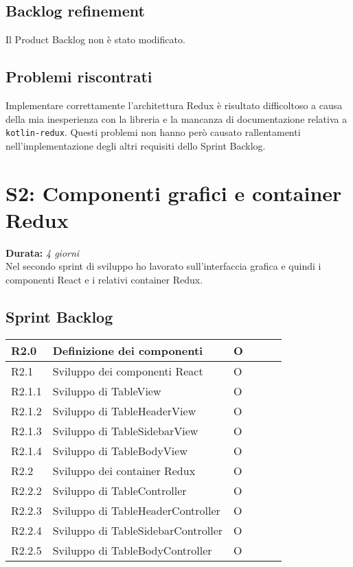 \subsection{Backlog refinement}
Il Product Backlog non è stato modificato.

\subsection{Problemi riscontrati}
Implementare correttamente l'architettura Redux è risultato difficoltoso a causa della mia inesperienza con la libreria e la mancanza di documentazione relativa a \verb|kotlin-redux|. Questi problemi non hanno però causato rallentamenti nell'implementazione degli altri requisiti dello Sprint Backlog.

\newpage

\section{S2: Componenti grafici e container Redux}
\textbf{Durata:} \textit{4 giorni} \\
Nel secondo sprint di sviluppo ho lavorato sull'interfaccia grafica e quindi i componenti React e i relativi container Redux.

\subsection{Sprint Backlog}
\begin{longtable} {
		|>{}p{10mm}| 
		|>{}p{90mm}|
		|>{}p{15mm}|
		|>{}p{15mm}|
		|>{}p{15mm}|
		>{}p{0mm}}
	\hline
R2.0   & \textbf{Definizione dei componenti} & O\\ \hline
R2.1   & Sviluppo dei componenti React 		  & O\\ \hline
R2.1.1 & Sviluppo di TableView                & O\\ \hline
R2.1.2 & Sviluppo di TableHeaderView          & O\\ \hline
R2.1.3 & Sviluppo di TableSidebarView         & O \\ \hline
R2.1.4 & Sviluppo di TableBodyView            & O\\ \hline
R2.2   & Sviluppo dei container Redux         & O  \\ \hline
R2.2.2 & Sviluppo di TableController          & O   \\ \hline
R2.2.3 & Sviluppo di TableHeaderController    & O      \\ \hline
R2.2.4 & Sviluppo di TableSidebarController   & O      \\ \hline
R2.2.5 & Sviluppo di TableBodyController      & O   \\ \hline
\end{longtable}

